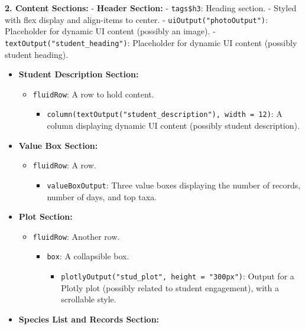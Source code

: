 \documentclass[
]{book}
\providecommand{\tightlist}{%
  \setlength{\itemsep}{0pt}\setlength{\parskip}{0pt}}
\begin{document}
\textbf{2. Content Sections:}
- \textbf{Header Section:}
- \texttt{tags\$h3}: Heading section.
- Styled with flex display and align-items to center.
- \texttt{uiOutput("photoOutput")}: Placeholder for dynamic UI content (possibly an image).
- \texttt{textOutput("student\_heading")}: Placeholder for dynamic UI content (possibly student heading).

\begin{itemize}
\tightlist
\item
  \textbf{Student Description Section:}

  \begin{itemize}
  \tightlist
  \item
    \texttt{fluidRow}: A row to hold content.

    \begin{itemize}
    \tightlist
    \item
      \texttt{column(textOutput("student\_description"),\ width\ =\ 12)}: A column displaying dynamic UI content (possibly student description).
    \end{itemize}
  \end{itemize}
\item
  \textbf{Value Box Section:}

  \begin{itemize}
  \tightlist
  \item
    \texttt{fluidRow}: A row.

    \begin{itemize}
    \tightlist
    \item
      \texttt{valueBoxOutput}: Three value boxes displaying the number of records, number of days, and top taxa.
    \end{itemize}
  \end{itemize}
\item
  \textbf{Plot Section:}

  \begin{itemize}
  \tightlist
  \item
    \texttt{fluidRow}: Another row.

    \begin{itemize}
    \tightlist
    \item
      \texttt{box}: A collapsible box.

      \begin{itemize}
      \tightlist
      \item
        \texttt{plotlyOutput("stud\_plot",\ height\ =\ "300px")}: Output for a Plotly plot (possibly related to student engagement), with a scrollable style.
      \end{itemize}
    \end{itemize}
  \end{itemize}
\item
  \textbf{Species List and Records Section:}


\end{itemize}
\end{document}

